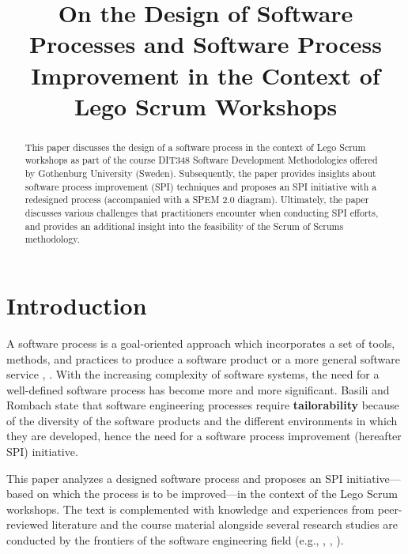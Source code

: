 \documentclass[conference]{IEEEtran}
\begin{document}
\title{On the Design of Software Processes and Software Process Improvement in
the Context of Lego Scrum Workshops}

\author{
}
\maketitle

\begin{abstract}
This paper discusses the design of a software process in the context of Lego
Scrum workshops as part of the course DIT348 Software Development Methodologies
offered by Gothenburg University (Sweden). Subsequently, the paper provides
insights about software process improvement (SPI) techniques and proposes an
SPI initiative with a redesigned process (accompanied with a SPEM 2.0 diagram).
Ultimately, the paper discusses various challenges that practitioners encounter
when conducting SPI efforts, and provides an additional insight into the
feasibility of the Scrum of Scrums methodology.
\end{abstract}

\section{Introduction}


A software process is a goal-oriented approach which incorporates a set of
tools, methods, and practices to produce a software product or a more general
software service \cite{Munch2012}, \cite{Humphrey1989}. With the increasing
complexity of software systems, the need for a well-defined software process
has become more and more significant. Basili and Rombach \cite{Basili1988}
state that software engineering processes require \textbf{tailorability}
because of the diversity of the software products and the different
environments in which they are developed, hence the need for a software process
improvement (hereafter SPI) initiative.

This paper analyzes a designed software process and proposes an SPI
initiative---based on which the process is to be improved---in the context of
the Lego Scrum workshops. The text is complemented with knowledge and
experiences from peer-reviewed literature and the course material alongside
several research studies are conducted by the frontiers of the software
engineering field (e.g., \cite{Basili1988}, \cite{Caldiera1994},
\cite{Schwaber2020}).
\end{document}
